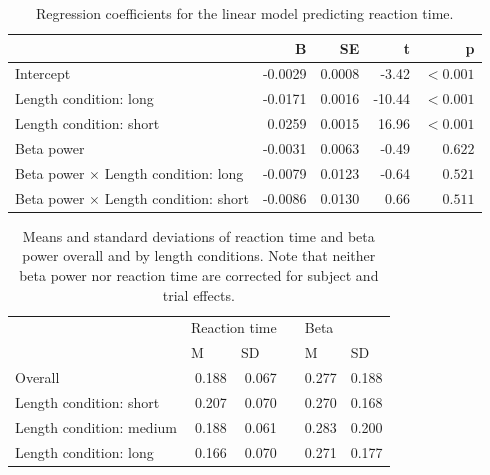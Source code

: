 \documentclass[man,floatsintext]{apa6} %
\begin{document}
\begin{table}[ht]
  \caption{Regression coefficients for the linear model predicting reaction time.}
  \begin{flushleft}
    \begin{tabular}{lrrrr}
      \toprule
                                                    & B        & SE         & t       & p         \\
      \midrule
      Intercept                                     & -0.0029  & 0.0008     &  -3.42  & $< 0.001$ \\
      Length condition: long                        & -0.0171  & 0.0016     & -10.44  & $< 0.001$ \\
      Length condition: short                       &  0.0259  & 0.0015     &  16.96  & $< 0.001$ \\
      Beta power                                    & -0.0031  & 0.0063     &  -0.49  & $0.622$   \\
      Beta power $\times$ Length condition: long    & -0.0079  & 0.0123     &  -0.64  & $0.521$   \\
      Beta power $\times$ Length condition: short   & -0.0086  & 0.0130     &   0.66  & $0.511$   \\
      \bottomrule
    \end{tabular}
  \end{flushleft}
  \label{tbl:regression}
\end{table}

\begin{table}[ht]
  \caption{Means and standard deviations of reaction time and beta power overall and by length conditions. Note that neither beta power nor reaction time are corrected for subject and trial effects.}
  \begin{flushleft}
    \begin{tabular}{lrrrrr}
      \toprule
                               & \multicolumn{2}{l}{Reaction time}              && \multicolumn{2}{l}{Beta}                       \\ \cmidrule{2-3} \cmidrule{5-6}
                               & \multicolumn{1}{l}{M} & \multicolumn{1}{l}{SD} && \multicolumn{1}{l}{M} & \multicolumn{1}{l}{SD} \\
      \midrule
      Overall                  & 0.188                 &  0.067                 && 0.277                 & 0.188                  \\
      Length condition: short  & 0.207                 &  0.070                 && 0.270                 & 0.168                  \\
      Length condition: medium & 0.188                 &  0.061                 && 0.283                 & 0.200                  \\
      Length condition: long   & 0.166                 &  0.070                 && 0.271                 & 0.177                  \\
      \bottomrule
    \end{tabular}
  \end{flushleft}
  \label{tbl:descriptives}
\end{table}
\end{document}
